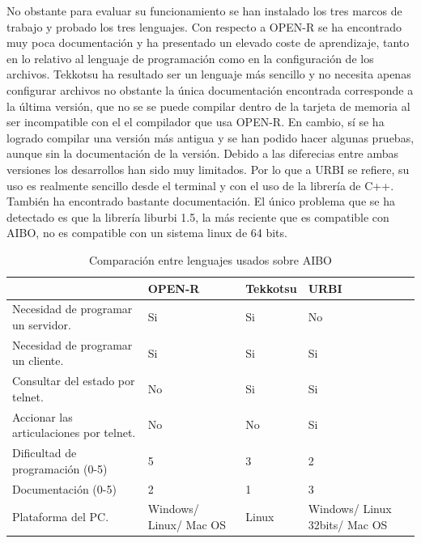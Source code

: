\documentclass[12pt,a4paper,final,twoside]{book}
\begin{document}
No obstante para evaluar su funcionamiento se han instalado los tres marcos de trabajo y probado los tres lenguajes.
Con respecto a OPEN-R se ha encontrado muy poca documentación y ha presentado un elevado coste de aprendizaje, tanto en lo relativo al lenguaje de programación como en la configuración de los archivos. Tekkotsu ha resultado ser un lenguaje más sencillo y no necesita apenas configurar archivos no obstante la única documentación encontrada corresponde a la última versión, que no se se puede compilar dentro de la tarjeta de memoria al ser incompatible con el el compilador que usa OPEN-R. En cambio, sí se ha logrado compilar una versión más antigua y se han podido hacer algunas pruebas, aunque sin la documentación de la versión. Debido a las diferecias entre ambas versiones los desarrollos han sido muy limitados. 
Por lo que a URBI se refiere, su uso es realmente sencillo desde el terminal y con el uso de la librería de C++. También ha encontrado bastante documentación. El único problema que se ha detectado es que la librería liburbi 1.5, la más reciente que es compatible con  AIBO, no es compatible con un sistema linux de 64 bits. 

\begin{table}[H]
\begin{center}
\begin{tabulary}{\textwidth}{|p{5cm}|p{2.5cm}|p{2.5cm}|p{2.5cm}|}
\hline

& \textbf{OPEN-R}

& \textbf{Tekkotsu}& \textbf{URBI}  \\\hline
Necesidad de programar un servidor.
& Si

& Si& No \\ \hline
Necesidad de programar un cliente.
& Si

& Si& Si\\ \hline
Consultar del estado por telnet.
& No

& Si& Si\\ \hline
Accionar las articulaciones por telnet.
& No

& No& Si\\ \hline
Dificultad de programación (0-5)
& 5

& 3& 2 \\ \hline
Documentación (0-5)
& 2

& 1& 3\\ \hline
Plataforma del PC.
& Windows/ Linux/ Mac OS

& Linux& Windows/ Linux 32bits/ Mac OS\\ \hline
\end{tabulary}
\end{center}
\caption{Comparación entre lenguajes usados sobre AIBO\label{complleng}}
\end{table}
\end{document}
